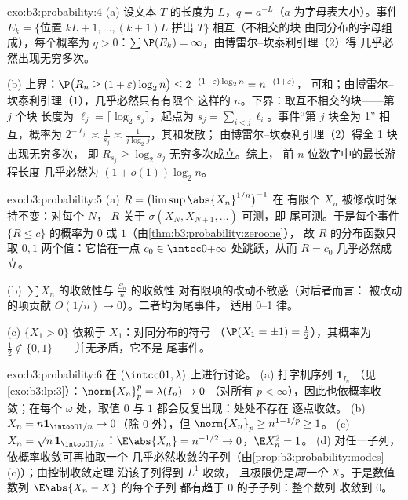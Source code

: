 \begin{solution}{exo:b3:probability:4}
(a) 设文本 $T$ 的长度为 $L$，$q = a^{-L}$（$a$
为字母表大小）。事件 $E_k = \{$位置 $kL+1,
\dots, (k+1)L$ 拼出 $T\}$ 相互（不相交的块
由同分布的字母组成），每个概率为 $q > 0$：$\sum\P(E_k)
= \infty$，由博雷尔–坎泰利引理（2）得
几乎必然出现无穷多次。

(b) 上界：$\P\bigl(R_n \geq (1+\varepsilon)\log_2n\bigr)
\leq 2^{-(1+\varepsilon)\log_2n} = n^{-(1+\varepsilon)}$，
可和；由博雷尔–坎泰利引理（1），几乎必然只有有限个
这样的 $n$。下界：取互不相交的块——第 $j$ 个块
长度为 $\ell_j = \lceil\log_2s_j\rceil$，起点为 $s_j =
\sum_{i<j}\ell_i$。事件“第 $j$ 块全为 1”
相互，概率为 $2^{-\ell_j} \asymp
\frac1{s_j} \asymp \frac1{j\log_2 j}$，其和发散；
由博雷尔–坎泰利引理（2）得全 1 块出现无穷多次，
即 $R_{s_j} \geq \log_2 s_j$ 无穷多次成立。综上，
前 $n$ 位数字中的最长游程长度
几乎必然为 $(1 + o(1))\log_2n$。
\end{solution}

\begin{solution}{exo:b3:probability:5}
(a) $R = \bigl(\limsup\abs{X_n}^{1/n}\bigr)^{-1}$ 在
有限个 $X_n$ 被修改时保持不变：对每个 $N$，
$R$ 关于 $\sigma(X_N, X_{N+1}, \dots)$ 可测，即
尾可测。于是每个事件 $\{R \leq c\}$
的概率为 $0$ 或 $1$（由\cref{thm:b3:probability:zeroone}），
故 $R$ 的分布函数只取
$0, 1$ 两个值：它恰在一点 $c_0 \in
\intcc0{+\infty}$ 处跳跃，从而 $R = c_0$ 几乎必然成立。

(b) $\sum X_n$ 的收敛性与 $\frac{S_n}n$ 的收敛性
对有限项的改动不敏感（对后者而言：
被改动的项贡献 $O(1/n) \to 0$）。二者均为尾事件，
适用 0–1 律。

(c) $\{X_1 > 0\}$ 依赖于 $X_1$：对同分布的符号
（$\P(X_1 = \pm1) = \frac12$），其概率为 $\frac12
\notin \{0,1\}$——并无矛盾，它不是
尾事件。
\end{solution}

\begin{solution}{exo:b3:probability:6}
在 $(\intcc01, \lambda)$ 上进行讨论。
(a) 打字机序列 $\mathbf 1_{I_n}$
（见\cref{exo:b3:lp:3}）：$\norm{X_n}_p^p = \lambda(I_n) \to 0$
（对所有 $p < \infty$），因此也依概率收敛；在每个
$\omega$ 处，取值 $0$ 与 $1$ 都会反复出现：处处不存在
逐点收敛。
(b) $X_n = n\mathbf 1_{\intoo0{1/n}} \to 0$（除 $0$ 外），但
$\norm{X_n}_p \geq n^{1 - 1/p} \geq 1$。
(c) $X_n = \sqrt n\,\mathbf 1_{\intoo0{1/n}}$：$\E\abs{X_n} =
n^{-1/2} \to 0$，$\E X_n^2 = 1$。
(d) 对任一子列，依概率收敛可再抽取一个
几乎必然收敛的子列（由\cref{prop:b3:probability:modes}(c)）；由控制收敛定理
沿该子列得到 $L^1$ 收敛，
且极限仍是\emph{同一个}
$X$。于是数值数列 $\E\abs{X_n - X}$ 的每个子列
都有趋于 $0$ 的子子列：整个数列
收敛到 $0$。
\end{solution}

